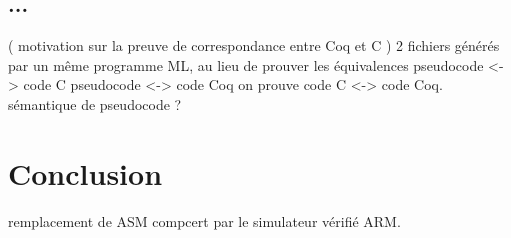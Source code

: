 \documentclass[a4paper, 11pt]{article}
\begin{document}
\subsection{...}
  ( motivation sur la preuve de correspondance entre Coq et C )
  2 fichiers générés par un même programme ML, au lieu de prouver les équivalences 
  pseudocode <-> code C
  pseudocode <-> code Coq
  on prouve code C <-> code Coq. sémantique de pseudocode ?

\section{Conclusion}
remplacement de ASM compcert par le simulateur vérifié ARM.
\end{document}

